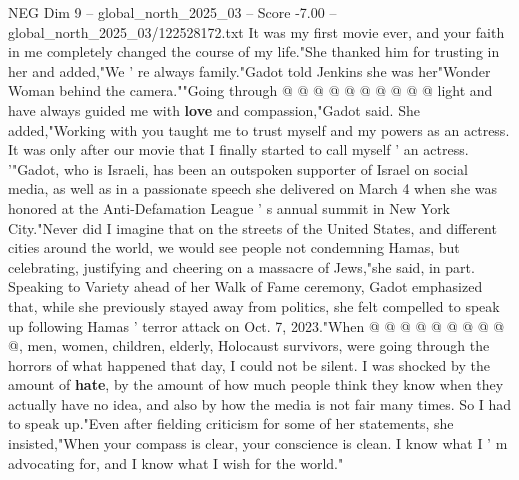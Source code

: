 \begin{textsample}{NEG Dim 9 – global\_north\_2025\_03 – Score -7.00 – global\_north\_2025\_03/122528172.txt}
It was my first movie ever, and your faith in me completely changed the course of my life."She thanked him for trusting in her and added,"We ' re always family."Gadot told Jenkins she was her"Wonder Woman behind the camera.""Going through @ @ @ @ @ @ @ @ @ @ light and have always guided me with \textbf{love} and compassion,"Gadot said.
She added,"Working with you taught me to trust myself and my powers as an actress.
It was only after our movie that I finally started to call myself ' an actress. '"Gadot, who is Israeli, has been an outspoken supporter of Israel on social media, as well as in a passionate speech she delivered on March 4 when she was honored at the Anti-Defamation League ' s annual summit in New York City."Never did I imagine that on the streets of the United States, and different cities around the world, we would see people not condemning Hamas, but celebrating, justifying and cheering on a massacre of Jews,"she said, in part.
Speaking to Variety ahead of her Walk of Fame ceremony, Gadot emphasized that, while she previously stayed away from politics, she felt compelled to speak up following Hamas ' terror attack on Oct. 7, 2023."When @ @ @ @ @ @ @ @ @ @, men, women, children, elderly, Holocaust survivors, were going through the horrors of what happened that day, I could not be silent.
I was shocked by the amount of \textbf{hate}, by the amount of how much people think they know when they actually have no idea, and also by how the media is not fair many times.
So I had to speak up."Even after fielding criticism for some of her statements, she insisted,"When your compass is clear, your conscience is clean.
I know what I ' m advocating for, and I know what I wish for the world."

\end{textsample}

